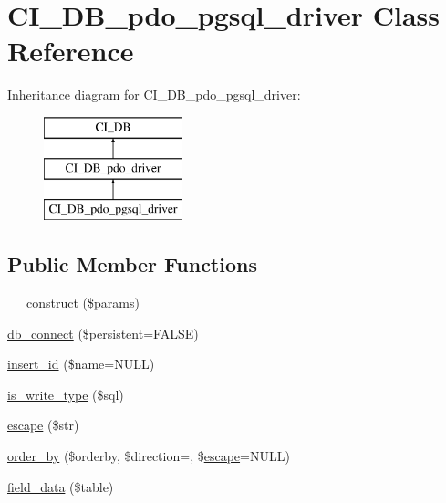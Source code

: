 \hypertarget{class_c_i___d_b__pdo__pgsql__driver}{}\section{C\+I\+\_\+\+D\+B\+\_\+pdo\+\_\+pgsql\+\_\+driver Class Reference}
\label{class_c_i___d_b__pdo__pgsql__driver}
Inheritance diagram for C\+I\+\_\+\+D\+B\+\_\+pdo\+\_\+pgsql\+\_\+driver\+:\begin{figure}[H]
\begin{center}
\leavevmode
\includegraphics[height=3.000000cm]{class_c_i___d_b__pdo__pgsql__driver}
\end{center}
\end{figure}
\subsection*{Public Member Functions}
\begin{DoxyCompactItemize}
\item 
\mbox{\hyperlink{class_c_i___d_b__pdo__pgsql__driver_ade44bd4f73b0a3cc69bdb4c1a0388aed}{\+\_\+\+\_\+construct}} (\$params)
\item 
\mbox{\hyperlink{class_c_i___d_b__pdo__pgsql__driver_ac5d13293e1c243a67da35abef8e30cee}{db\+\_\+connect}} (\$persistent=F\+A\+L\+SE)
\item 
\mbox{\hyperlink{class_c_i___d_b__pdo__pgsql__driver_a5cc6768067380882e7153de420221155}{insert\+\_\+id}} (\$name=N\+U\+LL)
\item 
\mbox{\hyperlink{class_c_i___d_b__pdo__pgsql__driver_a7789b0242b9d9a2f99c4146bb31e5ce9}{is\+\_\+write\+\_\+type}} (\$sql)
\item 
\mbox{\hyperlink{class_c_i___d_b__pdo__pgsql__driver_a7767015b3a09c836e8df759a08c956c4}{escape}} (\$str)
\item 
\mbox{\hyperlink{class_c_i___d_b__pdo__pgsql__driver_ad72dcece147716162fadaae0e822b61f}{order\+\_\+by}} (\$orderby, \$direction=\textquotesingle{}\textquotesingle{}, \$\mbox{\hyperlink{class_c_i___d_b__pdo__pgsql__driver_a7767015b3a09c836e8df759a08c956c4}{escape}}=N\+U\+LL)
\item 
\mbox{\hyperlink{class_c_i___d_b__pdo__pgsql__driver_a8a0b783e3b1e4bd40862b749fd3dd9b5}{field\+\_\+data}} (\$table)
\end{DoxyCompactItemize}
